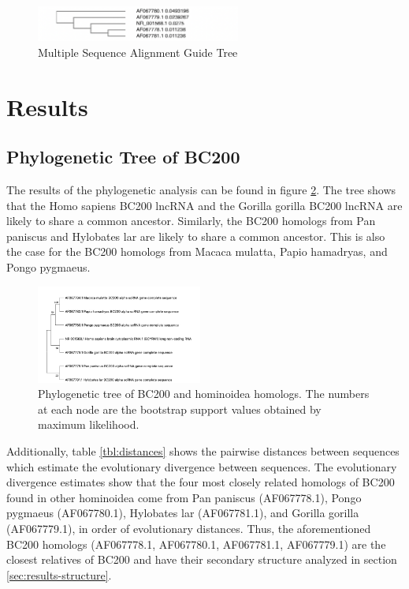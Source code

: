 \documentclass[conference, 11pt]{IEEEtran}
\begin{document}
\begin{figure}[ht]
  \centering
  \label{fig:Guide-tree}
  \includegraphics[width=0.6\textwidth]{figs/guidetree.png}
  \caption{Multiple Sequence Alignment Guide Tree}
\end{figure}

\section{Results}\label{sec:results}

\subsection{Phylogenetic Tree of BC200}

The results of the phylogenetic analysis can be found in figure \ref{fig:phylo-tree}. 
The tree shows that the Homo sapiens BC200 lncRNA and the Gorilla gorilla BC200 lncRNA are likely to share a common ancestor. 
Similarly, the BC200 homologs from Pan paniscus and Hylobates lar are likely to share a common ancestor. 
This is also the case for the BC200 homologs from Macaca mulatta, Papio hamadryas, and Pongo pygmaeus. 

\begin{figure}[ht]
  \centering
  \includegraphics[width=0.485\textwidth]{figs/phylogenetic-tree.jpg}
  \caption{Phylogenetic tree of BC200 and hominoidea homologs. The numbers at each node are the bootstrap support values obtained by maximum likelihood.}
  \label{fig:phylo-tree}
\end{figure}

Additionally, table \ref{tbl:distances} shows the pairwise distances between sequences which estimate the evolutionary divergence between sequences. 
The evolutionary divergence estimates show that the four most closely related homologs of BC200 found in other hominoidea come from Pan paniscus (AF067778.1), Pongo pygmaeus (AF067780.1), Hylobates lar (AF067781.1), and Gorilla gorilla (AF067779.1), in order of evolutionary distances. 
Thus, the aforementioned BC200 homologs (AF067778.1, AF067780.1, AF067781.1, AF067779.1) are the closest relatives of BC200 and have their secondary structure analyzed in section \ref{sec:results-structure}.
\end{document}
